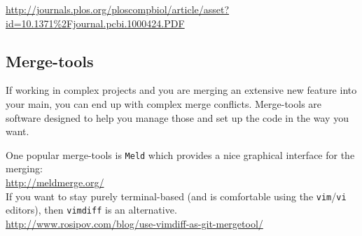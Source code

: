 \documentclass[../main/git_course_main.tex]{subfiles}
\begin{document}
	\url{http://journals.plos.org/ploscompbiol/article/asset?id=10.1371\%2Fjournal.pcbi.1000424.PDF}
	
	\subsection{Merge-tools}
	
	If working in complex projects and you are merging an extensive new feature into your main, you can end up with complex merge conflicts. Merge-tools are software designed to help you manage those and set up the code in the way you want.
	
	One popular merge-tools is \verb$Meld$ which provides a nice graphical interface for the merging: \\
	
	\url{http://meldmerge.org/} \\
	
	If you want to stay purely terminal-based (and is comfortable using the \verb$vim$/\verb$vi$ editors), then \verb$vimdiff$ is an alternative. \\
	
	\url{http://www.rosipov.com/blog/use-vimdiff-as-git-mergetool/}
	
\end{document}
